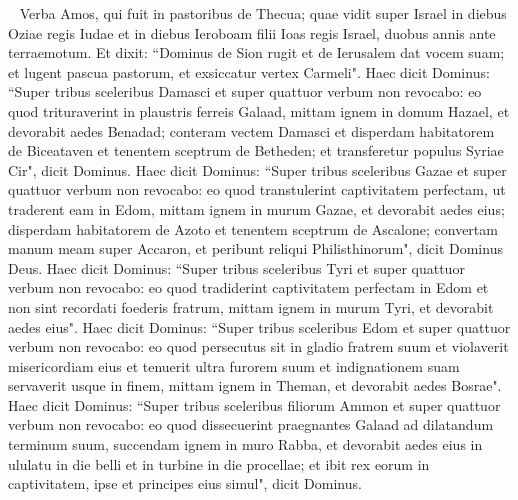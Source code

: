 
\begin{biblechapter}   
\verse Verba Amos, qui fuit in pastoribus de Thecua; quae vidit super Israel in diebus Oziae regis Iudae et in diebus Ieroboam filii Ioas regis Israel, duobus annis ante terraemotum. 
\verse Et dixit: “Dominus de Sion rugit et de Ierusalem dat vocem suam; et lugent pascua pastorum, et exsiccatur vertex Carmeli". 
\verse Haec dicit Dominus: “Super tribus sceleribus Damasci et super quattuor verbum non revocabo: eo quod trituraverint in plaustris ferreis Galaad, 
\verse mittam ignem in domum Hazael, et devorabit aedes Benadad; 
\verse conteram vectem Damasci et disperdam habitatorem de Biceataven et tenentem sceptrum de Betheden; et transferetur populus Syriae Cir", dicit Dominus. 
\verse Haec dicit Dominus: “Super tribus sceleribus Gazae et super quattuor verbum non revocabo: eo quod transtulerint captivitatem perfectam, ut traderent eam in Edom, 
\verse mittam ignem in murum Gazae, et devorabit aedes eius; 
\verse disperdam habitatorem de Azoto et tenentem sceptrum de Ascalone; convertam manum meam super Accaron, et peribunt reliqui Philisthinorum", dicit Dominus Deus. 
\verse Haec dicit Dominus: “Super tribus sceleribus Tyri et super quattuor verbum non revocabo: eo quod tradiderint captivitatem perfectam in Edom et non sint recordati foederis fratrum, 
\verse mittam ignem in murum Tyri, et devorabit aedes eius". 
\verse Haec dicit Dominus: “Super tribus sceleribus Edom et super quattuor verbum non revocabo: eo quod persecutus sit in gladio fratrem suum et violaverit misericordiam eius et tenuerit ultra furorem suum et indignationem suam servaverit usque in finem, 
\verse mittam ignem in Theman, et devorabit aedes Bosrae". 
\verse Haec dicit Dominus: “Super tribus sceleribus filiorum Ammon et super quattuor verbum non revocabo: eo quod dissecuerint praegnantes Galaad ad dilatandum terminum suum, 
\verse succendam ignem in muro Rabba, et devorabit aedes eius in ululatu in die belli et in turbine in die procellae; 
\verse et ibit rex eorum in captivitatem, ipse et principes eius simul", dicit Dominus. 
\end{biblechapter}

